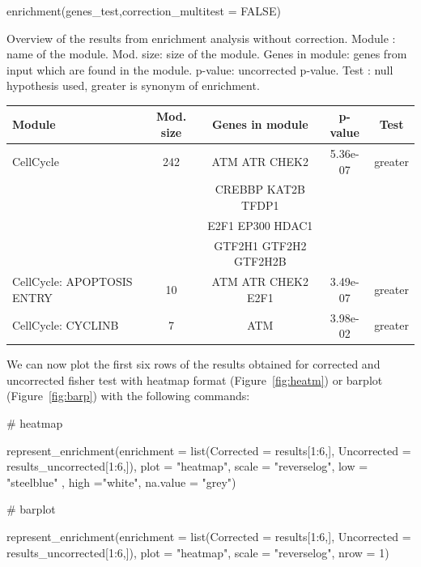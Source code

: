 \begin{example}
enrichment(genes_test,correction_multitest = FALSE)
\end{example}


\begin{widetable}[h!]
  \centering
  \caption{Overview of the results from enrichment analysis without correction.
  Module : name of the module. Mod. size: size of the module. Genes in module:
  genes from input which are found in the module. p-value: uncorrected p-value.
  Test : null hypothesis used, greater is synonym of enrichment.}
  \label{tab:table2}

  \begin{tabular}{l c c c c}
	\toprule
Module & Mod. size & Genes in module & p-value & Test\\
	\midrule
CellCycle & 242 & ATM ATR CHEK2   & 5.36e-07 & greater \\
          &   &  CREBBP KAT2B TFDP1   &          &         \\
          &   &  E2F1 EP300 HDAC1    &          &         \\
          &	  & GTF2H1 GTF2H2 GTF2H2B &	& \\
CellCycle: APOPTOSIS ENTRY & 10 & ATM ATR CHEK2 E2F1 & 3.49e-07 & greater \\
CellCycle: CYCLINB			& 7  & ATM 				  & 3.98e-02 & greater \\



	\bottomrule

	\end{tabular}
\end{widetable}

We can now plot the first six rows of the results obtained for corrected and
uncorrected fisher test with heatmap format (Figure~\ref{fig:heatm}) or barplot
(Figure~\ref{fig:barp}) with the following commands:

\begin{example}
# heatmap

represent_enrichment(enrichment = list(Corrected = results[1:6,], 
Uncorrected = results_uncorrected[1:6,]),
                                plot = "heatmap", scale = "reverselog", 
                                low = "steelblue" , high ="white", na.value = "grey")

# barplot 

 represent_enrichment(enrichment = list(Corrected = results[1:6,], 
                             Uncorrected = results_uncorrected[1:6,]),
                               plot = "heatmap", scale = "reverselog", 
                               nrow = 1)
\end{example}

